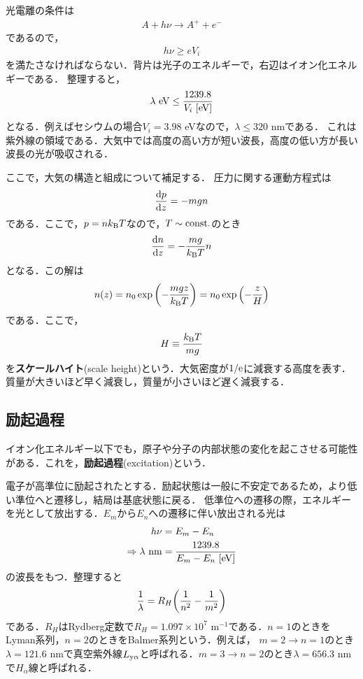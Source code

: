 \documentclass{report}
\begin{document}
光電離の条件は
\begin{align}
  A + h\nu \rightarrow A^+ + e^-
\end{align}
であるので，
\begin{align}
  h\nu \geq e V_i
\end{align}
を満たさなければならない．背片は光子のエネルギーで，右辺はイオン化エネルギーである．
整理すると，
\begin{align}
  \lambda\ \mathrm{eV} \leq \frac{1239.8}{V_i\ [\mathrm{eV}]}
\end{align}
となる．例えばセシウムの場合$V_i = 3.98$ eVなので，$\lambda \leq 320$ nmである．
これは紫外線の領域である．大気中では高度の高い方が短い波長，高度の低い方が長い波長の光が吸収される．

ここで，大気の構造と組成について補足する．
圧力に関する運動方程式は
\begin{align}
  \dv{p}{z} = -mgn
\end{align}
である．ここで，$p=nk_{\mathrm{B}} T$なので，$T \sim \mathrm{const.}$のとき
\begin{align}
  \dv{n}{z} = - \frac{mg}{k_{\mathrm{B}} T}n
\end{align}
となる．この解は
\begin{align}
  n(z) = n_0 \exp\qty(-\frac{mgz}{k_{\mathrm{B}} T}) = n_0 \exp\qty(-\frac{z}{H})
\end{align}
である．ここで，
\begin{align}
  H \equiv \frac{k_{\mathrm{B}} T}{mg}
\end{align}
を\textbf{スケールハイト}(scale height)という．大気密度が$1/\mathrm{e}$に減衰する高度を表す．
質量が大きいほど早く減衰し，質量が小さいほど遅く減衰する．

\subsection{励起過程}
イオン化エネルギー以下でも，原子や分子の内部状態の変化を起こさせる可能性がある．これを，\textbf{励起過程}(excitation)という．

電子が高準位に励起されたとする．励起状態は一般に不安定であるため，より低い準位へと遷移し，結局は基底状態に戻る．
低準位への遷移の際，エネルギーを光として放出する．$E_m$から$E_n$への遷移に伴い放出される光は
\begin{align}
  h\nu &= E_m - E_n\\
  \Rightarrow \lambda\ \mathrm{nm} &= \frac{1239.8}{E_m - E_n\ [\mathrm{eV}]}
\end{align}
の波長をもつ．整理すると
\begin{align}
  \frac{1}{\lambda} = R_H\qty(\frac{1}{n^2} - \frac{1}{m^2})
\end{align}
である．$R_H$はRydberg定数で$R_H = 1.097 \times 10^7$ m$^{-1}$である．$n=1$のときをLyman系列，$n=2$のときをBalmer系列という．例えば，
$m=2\to n=1$のとき$\lambda = 121.6$ nmで真空紫外線$L_{\mathrm{y\alpha}}$と呼ばれる．$m=3\to n=2$のとき$\lambda = 656.3$ nmで$H_{\alpha}$線と呼ばれる．
\end{document}
